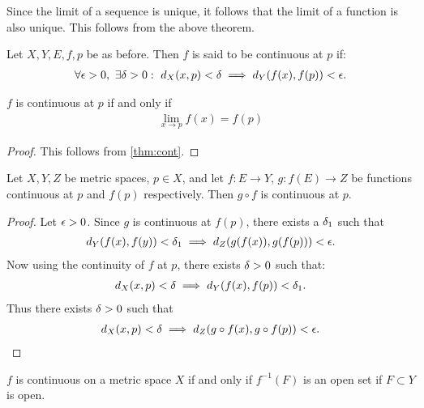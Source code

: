 \begin{remark}
  Since the limit of a sequence is unique, it follows that the limit of a function is also unique. This follows from the above theorem.
\end{remark}
\begin{definition}
  Let $X,Y,E,f,p$ be as before. Then $f$ is said to be continuous at $p$ if:
  \begin{align*}
    \forall \epsilon>0,\ \exists \delta>0:\ d_X(x,p) < \delta \implies d_Y(f(x), f(p)) < \epsilon.
  \end{align*}
\end{definition}
\begin{theorem}
  $f$ is continuous at $p$ if and only if
  \begin{align*}
    \lim_{x\to p} f(x) = f(p)
  \end{align*}
\end{theorem}
\begin{proof}
  This follows from \cref{thm:cont}.
\end{proof}
\begin{proposition}
  Let $X,Y,Z$ be metric spaces, $p\in X$, and let $f:E\to Y$, $g:f(E)\to Z$ be functions continuous at $p$ and $f(p)$ respectively. Then $g\circ f$ is continuous at $p$. 
\end{proposition}
\begin{proof}
 Let $\epsilon>0$. Since $g$ is continuous at $f(p)$, there exists a $\delta_1$ such that
 \begin{align*}
   d_Y(f(x), f(y))<\delta_1 \implies d_Z(g(f(x)), g(f(p))) < \epsilon.
 \end{align*}
 Now using the continuity of $f$ at $p$, there exists $\delta>0$ such that:
 \begin{align*}
   d_X(x,p) < \delta \implies d_Y(f(x), f(p)) < \delta_1.
 \end{align*}
 Thus there exists $\delta>0$ such that
 \begin{align*}
   d_X(x,p)< \delta \implies d_Z(g\circ f(x), g\circ f(p)) < \epsilon.
 \end{align*}
\end{proof}
\begin{theorem}
  $f$ is continuous on a metric space $X$ if and only if $f^{-1}(F)$ is an open set if $F\subset Y$ is open.
\end{theorem}
